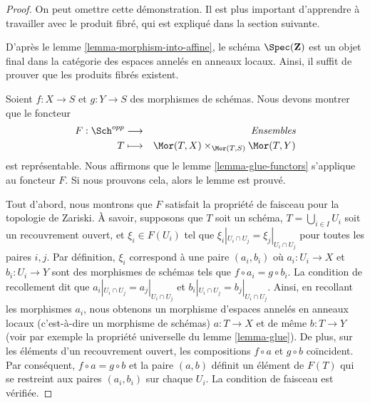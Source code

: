 \begin{proof}
On peut omettre cette démonstration. Il est plus important
d'apprendre à travailler avec le produit fibré, qui est expliqué dans
la section suivante.

\medskip\noindent
D'après le lemme \ref{lemma-morphism-into-affine},
le schéma $\Spec(\mathbf{Z})$ est un objet final
dans la catégorie des espaces annelés en anneaux locaux. Ainsi,
il suffit de prouver que les produits fibrés existent.

\medskip\noindent
Soient $f : X \to S$ et $g : Y \to S$ des morphismes de schémas. Nous devons montrer
que le foncteur
\begin{eqnarray*}
F : \Sch^{opp} & \longrightarrow & \textit{Ensembles}
\\ T & \longmapsto
& \Mor(T, X) \times_{\Mor(T, S)} \Mor(T, Y)
\end{eqnarray*}
est représentable. Nous affirmons que le lemme \ref{lemma-glue-functors}
s'applique au foncteur $F$. Si nous prouvons cela, alors le lemme est prouvé.

\medskip\noindent
Tout d'abord, nous montrons que $F$ satisfait la propriété de
faisceau pour la topologie de Zariski. À savoir, supposons que $T$
soit un schéma, $T = \bigcup_{i \in I} U_i$ soit un
recouvrement ouvert, et $\xi_i \in
F(U_i)$ tel que $\xi_i|_{U_i \cap U_j} = \xi_j|_{U_i \cap
U_j}$ pour toutes les paires $i, j$. Par définition, $\xi_i$
correspond à une paire $(a_i, b_i)$ où $a_i : U_i \to X$ et $b_i : U_i \to
Y$ sont des morphismes de schémas tels que $f \circ a_i = g \circ b_i$.
La condition de recollement dit
que $a_i|_{U_i \cap U_j} = a_j|_{U_i \cap U_j}$ et
$b_i|_{U_i
\cap U_j} = b_j|_{U_i \cap U_j}$. Ainsi,
en recollant les morphismes $a_i$, nous obtenons un morphisme
d'espaces annelés en anneaux locaux (c'est-à-dire un morphisme
de schémas) $a : T \to X$ et de même $b : T \to Y$ (voir par
exemple la propriété universelle du lemme \ref{lemma-glue}). De plus,
sur les éléments d'un recouvrement ouvert, les compositions
$f \circ a$ et $g \circ b$ coïncident. Par
conséquent, $f \circ a = g \circ b$ et la paire $(a, b)$ définit
un élément de $F(T)$ qui se restreint aux paires
$(a_i, b_i)$ sur chaque $U_i$. La condition de faisceau est vérifiée.


\end{proof}

